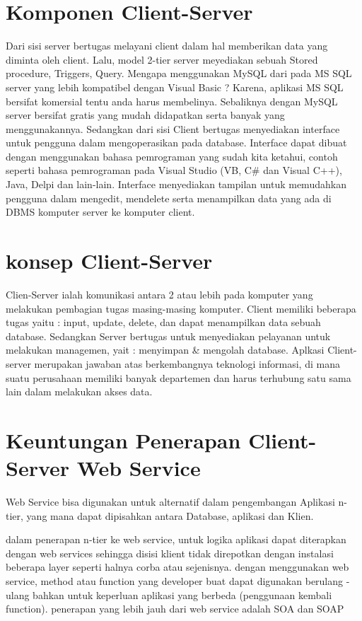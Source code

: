 {\section{Komponen Client-Server}
Dari sisi server bertugas melayani client dalam hal memberikan data yang diminta oleh client.
Lalu, model 2-tier server meyediakan sebuah Stored procedure, Triggers, Query. 
Mengapa menggunakan MySQL dari pada MS SQL server yang lebih kompatibel dengan Visual Basic ? Karena, aplikasi MS SQL bersifat komersial tentu anda harus membelinya. 
Sebaliknya dengan MySQL server bersifat gratis yang mudah didapatkan serta banyak yang menggunakannya. Sedangkan dari sisi Client bertugas menyediakan interface untuk pengguna dalam mengoperasikan pada database. 
Interface dapat dibuat dengan menggunakan bahasa pemrograman yang sudah kita ketahui, contoh seperti bahasa pemrograman pada Visual Studio (VB, C# dan Visual C++), Java, Delpi dan lain-lain. 
Interface menyediakan tampilan untuk memudahkan pengguna dalam mengedit, mendelete serta menampilkan data yang ada di DBMS komputer server ke komputer client.

\section{konsep Client-Server}
Clien-Server ialah komunikasi antara 2 atau lebih pada komputer yang melakukan pembagian tugas masing-masing komputer. Client memiliki beberapa tugas yaitu : input, update, delete, dan dapat menampilkan data sebuah database. Sedangkan Server bertugas untuk menyediakan pelayanan untuk melakukan managemen, yait : menyimpan & mengolah database. Aplkasi Client-server merupakan jawaban atas berkembangnya teknologi informasi, di mana suatu perusahaan memiliki banyak departemen dan harus terhubung satu sama lain dalam melakukan akses data.

\section{Keuntungan Penerapan Client-Server Web Service}
Web Service bisa digunakan untuk alternatif dalam pengembangan Aplikasi n-tier, yang mana dapat dipisahkan
antara Database, aplikasi dan Klien. 

dalam penerapan n-tier ke web service, untuk logika aplikasi dapat diterapkan dengan web services
sehingga disisi klient tidak direpotkan dengan instalasi beberapa layer seperti halnya corba atau sejenisnya.
dengan menggunakan web service, method atau function yang developer buat dapat digunakan berulang - ulang bahkan
untuk keperluan aplikasi yang berbeda (penggunaan kembali function). penerapan yang lebih jauh dari web service adalah SOA dan SOAP

}
